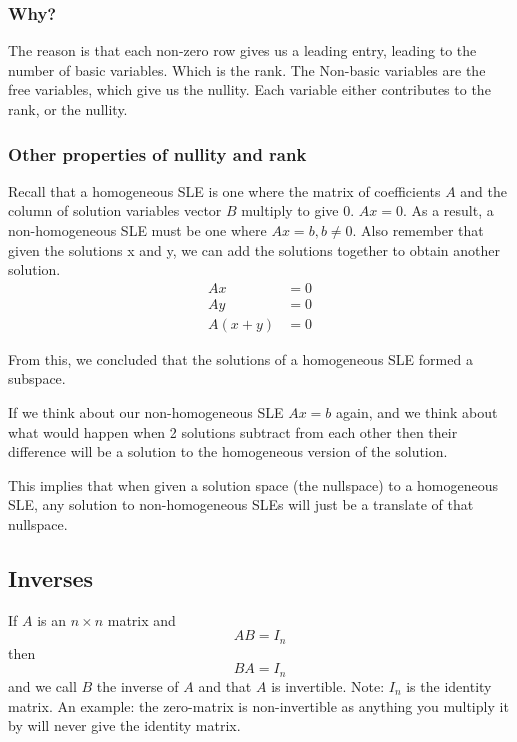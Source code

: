 \documentclass[11pt]{book}
\begin{document}
{{\subsubsection{Why?}
\par{The reason is that each non-zero row gives us a leading entry, leading to the number of basic variables. Which is the rank. The Non-basic variables are the free variables, which give us the nullity. Each variable either contributes to the rank, or the nullity.}
\subsubsection{Other properties of nullity and rank}
\par{Recall that a homogeneous SLE is one where the matrix of coefficients $A$ and the column of solution variables vector  $B$ multiply to give  0.  $Ax=0$. As a result, a non-homogeneous SLE must be one where $Ax=b,b\ne0$. Also remember that given the solutions x and y, we can add the solutions together to obtain another solution. }
\begin{align*}
	Ax&=0 \\
	Ay&=0 \\
	A\left(x+y\right)&=0 
\end{align*}
\par{From this, we concluded that the solutions of a homogeneous SLE formed a subspace. 

	If we think about our non-homogeneous SLE $Ax=b$ again, and we think about what would happen when 2 solutions subtract from each other then their difference will be a solution to the homogeneous version of the solution.

	This implies that when given a solution space (the nullspace) to a homogeneous SLE, any solution to non-homogeneous SLEs will just be a translate of that nullspace.
}

\subsection{Inverses}
\par{If $A$ is an  $n\times n$ matrix and \[
AB=I_{n}
\] then \[
BA=I_{n}
\] and we call $B$ the inverse of  $A$ and that  $A$ is invertible. Note: $I_{n}$ is the identity matrix. An example: the zero-matrix is non-invertible as anything you multiply it by will never give the identity matrix.}
}}
\end{document}

